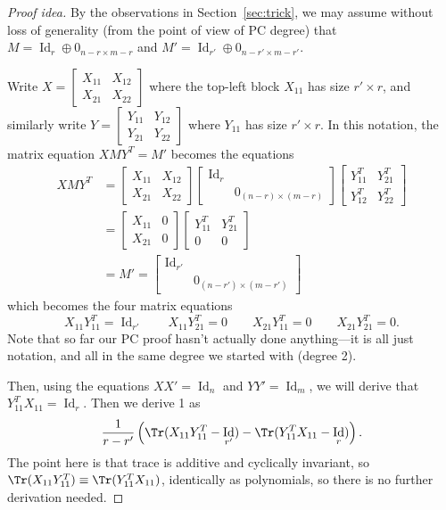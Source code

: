 \documentclass[10pt,a4paper]{article}
\theoremstyle{definition}
\DeclareMathOperator{\Id}{Id}
\begin{document}
\begin{proof}[Proof idea]
By the observations in Section~\ref{sec:trick}, we may assume without loss of generality (from the point of view of PC degree) that $M = \Id_r \oplus 0_{n - r \times m-r}$ and $M' = \Id_{r'} \oplus 0_{n-r' \times m-r'}$. 

Write $X = \begin{bmatrix} X_{11} & X_{12} \\ X_{21} & X_{22} \end{bmatrix}$ where the top-left block $X_{11}$ has size $r' \times r$, and similarly write $Y = \begin{bmatrix} Y_{11} & Y_{12} \\ Y_{21} & Y_{22} \end{bmatrix}$ where $Y_{11}$ has size $r' \times r$. In this notation, the matrix equation $XMY^T = M'$ becomes the equations
\begin{align*}
XMY^T & = \begin{bmatrix} X_{11} & X_{12} \\ X_{21} & X_{22} \end{bmatrix} \begin{bmatrix} \Id_r \\ & 0_{(n-r) \times (m-r)} \end{bmatrix} \begin{bmatrix} Y_{11}^T & Y_{21}^T \\ Y_{12}^T & Y_{22}^T  \end{bmatrix} \\
 & = \begin{bmatrix} X_{11} & 0 \\ X_{21} & 0 \end{bmatrix} \begin{bmatrix} Y_{11}^T & Y_{21}^T \\ 0 & 0 \end{bmatrix} \\
 & = M' = \begin{bmatrix} \Id_{r'} \\ & 0_{(n-r') \times (m-r')} \end{bmatrix}
\end{align*}
which becomes the four matrix equations
\begin{equation} \label{eq:2}
X_{11} Y_{11}^T = \Id_{r'} \qquad X_{11}Y_{21}^T = 0 \qquad X_{21}Y_{11}^T = 0 \qquad X_{21}Y_{21}^T = 0.
\end{equation}
Note that so far our PC proof hasn't actually done anything---it is all just notation, and all in the same degree we started with (degree 2).

Then, using the equations $XX' = \Id_n$ and $YY'=\Id_m$, we will derive that $Y_{11}^T X_{11} = \Id_r$. Then we derive 1 as 
\[
\frac{1}{r-r'}\left(\Tr(X_{11} Y_{11}^T - \Id_{r'}) - \Tr(Y_{11}^T X_{11} - \Id_r)\right).
\]
The point here is that trace is additive and cyclically invariant, so $\Tr(X_{11} Y_{11}^T) \equiv \Tr(Y_{11}^T X_{11})$, identically as polynomials, so there is no further derivation needed.
\end{proof}
\end{document}
